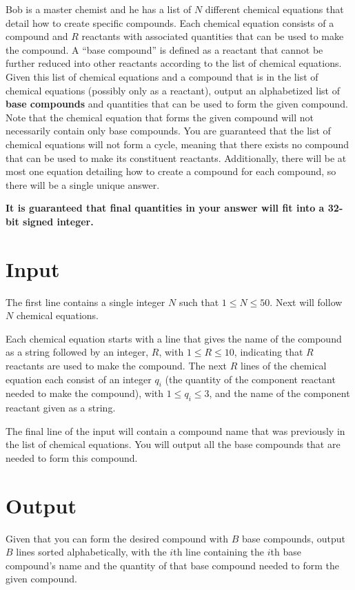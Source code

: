 
Bob is a master chemist and he has a list of $N$ different chemical equations that detail how to
create specific compounds. Each chemical equation consists of a compound and $R$ reactants with
associated quantities that can be used to make the compound. A ``base compound'' is defined as a reactant
that cannot be further reduced into other reactants according to the list of chemical equations.
Given this list of chemical equations and a compound that is in the list of chemical equations
(possibly only as a reactant), output an alphabetized list of \textbf{base compounds} and quantities that
can be used to form the given compound. Note that the chemical equation that forms the given 
compound will not necessarily contain only base compounds. You are guaranteed that the list of chemical
equations will not form a cycle, meaning that there exists no compound that can be used to make its
constituent reactants. Additionally, there will be at most one equation detailing how to create a
compound for each compound, so there will be a single unique answer.

\textbf{It is guaranteed that final quantities in your answer will fit into a 32-bit signed integer.}

\section*{Input}
The first line contains a single integer $N$ such that $1 \leq N \leq 50$.
Next will follow $N$ chemical equations. 

Each chemical equation starts with a line that gives the name of the compound as a string followed
by an integer, $R$, with $1 \leq R \leq 10$, indicating that $R$ reactants are used to make the compound.
The next $R$ lines of the chemical equation each consist of an integer $q_i$ (the quantity of
the component reactant needed to make the compound), with $1 \leq q_i \leq 3$, and the name of the
component reactant given as a string.

The final line of the input will contain a compound name that was previously in the list of chemical
equations. You will output all the base compounds that are needed to form this compound.

\section*{Output}
Given that you can form the desired compound with $B$ base compounds, output $B$ lines
sorted alphabetically, with the $i$th line containing the $i$th base compound's name and the quantity of
that base compound needed to form the given compound.
